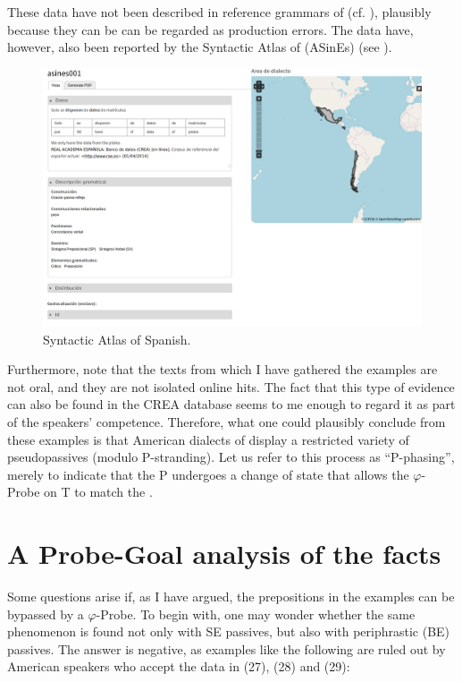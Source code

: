 \documentclass[output=paper]{langsci/langscibook}
\begin{document}
These data have not been described in reference grammars of  (cf. \citealt{Bosque1999,RAE-ASALE2009}), plausibly because they can be can be regarded as production errors. The data have, however, also been reported by the Syntactic Atlas of  (ASinEs) (see ).\largerpage[-1]
\vfill
\begin{figure}[bh]\caption{Syntactic Atlas of Spanish. \citep{GallegoWebsite}\label{ex:gallego:30}}
\includegraphics[width=\textwidth]{figures/gallego-screenshot.png}
\end{figure}


Furthermore, note that the texts from which I have gathered the examples are not oral, and they are not isolated online hits. The fact that this type of evidence can also be found in the CREA database seems to me enough to regard it as part of the speakers’ competence. Therefore, what one could plausibly conclude from these examples is that American dialects of  display a restricted variety of pseudopassives (modulo P-stranding). Let us refer to this process as “P-phasing”, merely to indicate that the P undergoes a change of state that allows the $\varphi ${}-Probe on T to match the \CATDP. 

\section{A Probe-Goal analysis of the facts}%


Some questions arise if, as I have argued, the prepositions in the examples can be bypassed by a $\varphi ${}-Probe. To begin with, one may wonder whether the same phenomenon is found not only with SE passives, but also with periphrastic (BE) passives. The answer is negative, as examples like the following are ruled out by American  speakers who accept the data in  (27), (28) and (29):
\end{document}
